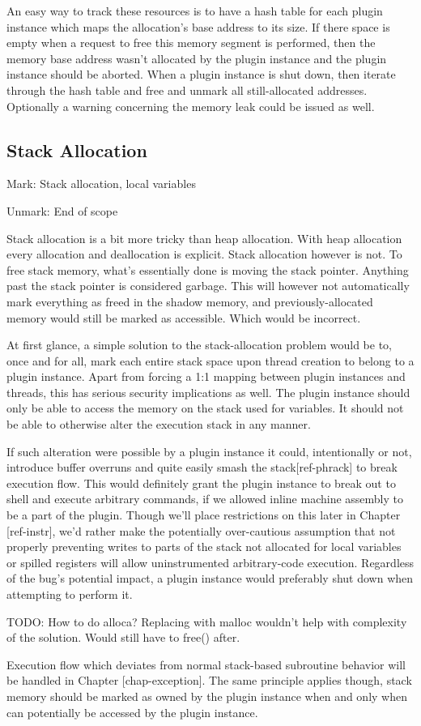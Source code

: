 An easy way to track these resources is to have a hash table for each plugin
instance which maps the allocation's base address to its size. If there space is
empty when a request to free this memory segment is performed, then the memory
base address wasn't allocated by the plugin instance and the plugin instance
should be aborted. When a plugin instance is shut down, then iterate through
the hash table and free and unmark all still-allocated addresses. Optionally a
warning concerning the memory leak could be issued as well.

\subsection {Stack Allocation}

Mark: Stack allocation, local variables

Unmark: End of scope

Stack allocation is a bit more tricky than heap allocation. With heap allocation
every allocation and deallocation is explicit. Stack allocation however is not.
To free stack memory, what's essentially done is moving the stack pointer.
Anything past the stack pointer is considered garbage. This will however not
automatically mark everything as freed in the shadow memory, and
previously-allocated memory would still be marked as accessible. Which would be
incorrect.

At first glance, a simple solution to the stack-allocation problem would be to,
once and for all, mark each entire stack space upon thread creation to belong to
a plugin instance. Apart from forcing a 1:1 mapping between plugin instances and
threads, this has serious security implications as well. The plugin instance
should only be able to access the memory on the stack used for variables. It
should not be able to otherwise alter the execution stack in any manner.

If such alteration were possible by a plugin instance it could, intentionally or
not, introduce buffer overruns and quite easily smash the stack[ref-phrack] to
break execution flow. This would definitely grant the plugin instance to break
out to shell and execute arbitrary commands, if we allowed inline machine
assembly to be a part of the plugin. Though we'll place restrictions on this
later in Chapter [ref-instr], we'd rather make the potentially over-cautious
assumption that not properly preventing writes to parts of the stack not
allocated for local variables or spilled registers will allow uninstrumented
arbitrary-code execution. Regardless of the bug's potential impact, a plugin
instance would preferably shut down when attempting to perform it.

TODO: How to do alloca? Replacing with malloc wouldn't help with complexity of
the solution. Would still have to free() after.

Execution flow which deviates from normal stack-based subroutine behavior will
be handled in Chapter [chap-exception]. The same principle applies though, stack
memory should be marked as owned by the plugin instance when and only when can
potentially be accessed by the plugin instance.

